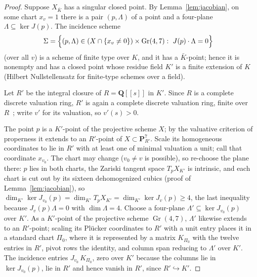 \documentclass[11pt]{article}
\theoremstyle{definition}
\theoremstyle{remark}
\newcommand{\QQ}{\mathbf Q}
\newcommand{\PP}{\mathbf P}
\newcommand{\Gr}{\operatorname{Gr}}
\begin{document}
\begin{proof}
Suppose $X_{\bar K}$ has a singular closed point.  By
Lemma~\ref{lem:jacobian}, on some chart $x_v=1$ there is a pair
$(p,\Lambda)$ of a point and a four-plane $\Lambda\subseteq\ker J(p)$.
The incidence scheme
\[
 \Sigma=\Bigl\{(p,\Lambda)\in
 (X\cap\{x_v\ne0\})\times\Gr(4,7):\ J(p)\cdot\Lambda=0\Bigr\}
\]
(over all $v$) is a scheme of finite type over $K$, and it has a
$\bar K$-point; hence it is nonempty and has a closed point whose residue
field $K'$ is a finite extension of $K$ (Hilbert Nullstellensatz for
finite-type schemes over a field).

Let $R'$ be the integral closure of $R=\QQ[[s]]$ in $K'$.  Since $R$ is a
complete discrete valuation ring, $R'$ is again a complete discrete
valuation ring, finite over $R$~\cite[Ch.~II]{SerreLF}; write $v'$ for its
valuation, so $v'(s)>0$.

The point $p$ is a $K'$-point of the projective scheme
$X$; by the valuative criterion of properness it extends to an $R'$-point
of $X\subset\PP^7_{R'}$.  Scale its homogeneous coordinates to lie in $R'$
with at least one of minimal valuation a unit; call that coordinate
$x_{v_0}$.  The chart may change ($v_0\neq v$ is possible), so re-choose
the plane there: $p$ lies in both charts, the Zariski tangent space
$T_pX_{K'}$ is intrinsic, and each chart is cut out by its sixteen
dehomogenized cubics (proof of Lemma~\ref{lem:jacobian}), so
$\dim_{K'}\ker J_{v_0}(p)=\dim_{K'}T_pX_{K'}
=\dim_{K'}\ker J_v(p)\geq4$, the last inequality because
$J_v(p)\Lambda=0$ with $\dim\Lambda=4$.  Choose a four-plane
$\Lambda'\subseteq\ker J_{v_0}(p)$ over $K'$.  As a $K'$-point of the
projective scheme $\Gr(4,7)$, $\Lambda'$ likewise extends to an
$R'$-point; scaling its Pl\"ucker coordinates to $R'$ with a
unit entry places it in a standard chart $\Pi_0$, where it is represented
by a matrix $K_{\Pi_0}$ with the twelve entries in $R'$, pivot rows the
identity, and column span reducing to $\Lambda'$ over $K'$.  The incidence
entries $J_{v_0}\,K_{\Pi_0}$, zero over $K'$ because the columns lie in
$\ker J_{v_0}(p)$, lie in $R'$ and hence vanish in $R'$, since
$R'\hookrightarrow K'$.


\end{proof}
\end{document}
